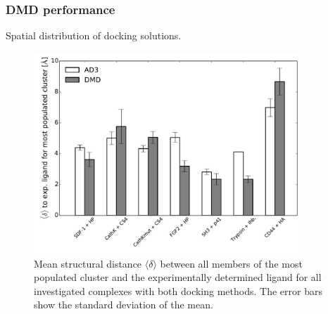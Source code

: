 \subsubsection{DMD performance}

{\sffamily Spatial distribution of docking solutions.}

\begin{figure}
\centering
\includegraphics[width=0.9\textwidth]{gfx/dmd/figure_4_clustering_dmd_vs_ad3_plots_pub_004.pdf}
\caption[]{
Mean structural distance $\langle \delta \rangle$ between all members of the
most populated cluster and the experimentally determined ligand for all
investigated complexes with both docking methods. The error bars show the
standard deviation of the mean.
}
\label{fig:dmd:clus_dmd_vs_ad3}
\end{figure}



